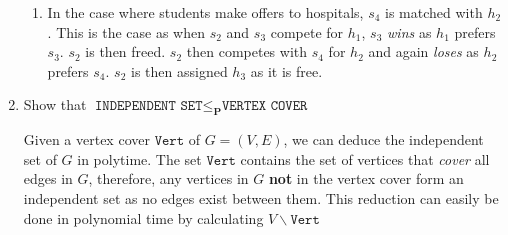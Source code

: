 \documentclass{article}
\begin{document}
\begin{enumerate}
\begin{enumerate}
          \item
                In the case where students make offers to hospitals, $s_{4}$ is matched with $h_{2}$. This is the case as when $s_{2}$ and $s_{3}$ compete for $h_{1}$, $s_{3}$ \textit{wins} as $h_{1}$ prefers $s_{3}$. $s_{2}$ is then freed. $s_{2}$ then competes with $s_{4}$ for $h_{2}$ and again \textit{loses} as $h_{2}$ prefers $s_{4}$. $s_{2}$ is then assigned $h_{3}$ as it is free.
        \end{enumerate}

  \item
        Show that $\texttt{INDEPENDENT SET} \leq_{\mathbf{P} } \texttt{VERTEX COVER} $

        Given a vertex cover $\texttt{Vert} $ of $G = (V,E)$, we can deduce the independent set of $G$ in polytime. The set $\texttt{Vert} $ contains the set of vertices that \textit{cover} all edges in $G$, therefore, any vertices in $G$ \textbf{not }in the vertex cover form an independent set as no edges exist between them. This reduction can easily be done in polynomial time by calculating $V \backslash \texttt{Vert} $

\end{enumerate}
\end{document}
